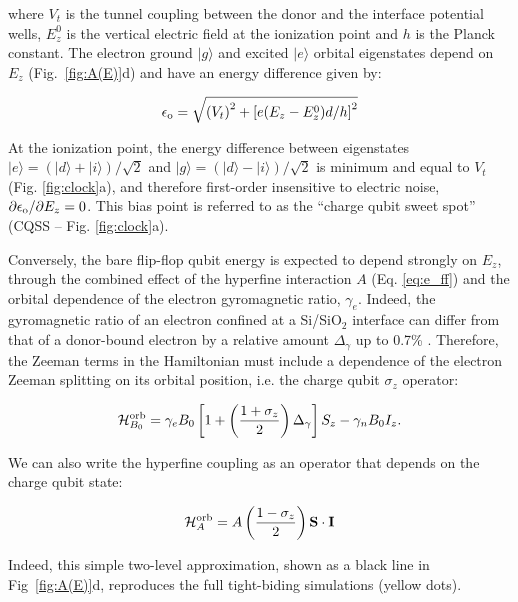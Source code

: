 \documentclass[aps,prb,superscriptaddress,nobibnotes,preprint]{revtex4-1}%
\begin{document}
where $V_t$ is the tunnel coupling between the donor and the interface potential wells, $E_z^0$ is the vertical electric field at the ionization point and $h$ is the Planck constant. The electron ground $|g\rangle$ and excited $|e\rangle$ orbital eigenstates depend on $E_z$ (Fig.~\ref{fig:A(E)}d) and have an energy difference given by:

\begin{equation} \label{eq:e_o}
\epsilon_{\rm o}=\sqrt{\left(V_t\right)^2+\left[e(E_z - E_z^0) d/h\right]^2}
\end{equation}

At the ionization point, the energy difference between eigenstates $|e\rangle=(|d\rangle+|i\rangle)/\sqrt{2}$ and $|g\rangle=(|d\rangle-|i\rangle)/\sqrt{2}$ is minimum and equal to $V_t$ (Fig. \ref{fig:clock}a), and therefore first-order insensitive to electric noise, $\partial\epsilon_{\rm o}/\partial E_z=0$. This bias point is referred to as the ``charge qubit sweet spot''\cite{Kim2015a} (CQSS -- Fig. \ref{fig:clock}a).

Conversely, the bare flip-flop qubit energy is expected to depend strongly on $E_z$, through the combined effect of the hyperfine interaction $A$ (Eq. \ref{eq:e_ff}) and the orbital dependence of the electron gyromagnetic ratio, $\gamma_e$. Indeed, the gyromagnetic ratio of an electron confined at a Si/SiO$_2$ interface can differ from that of a donor-bound electron by a relative amount $\Delta_{\gamma}$ up to 0.7\% \cite{Rahman2009a}. Therefore, the Zeeman terms in the Hamiltonian must include a dependence of the electron Zeeman splitting on its orbital position, i.e. the charge qubit $\sigma_z$ operator:

\begin{equation} \label{eq:H_Zeeman_orb}
\mathcal{H}_{B_0}^{\rm orb}=\gamma_e B_0\left[1+\left(\frac{1+\sigma_z}{2}\right)\Delta_\gamma\right]S_z - \gamma_n B_0 I_z.
\end{equation}

We can also write the hyperfine coupling as an operator that depends on the charge qubit state:

\begin{equation} \label{eq:H_A}
\mathcal{H}_{A}^{\rm orb}=A\left(\frac{1 - \sigma_z}{2}\right){\bf S\cdot I}
\end{equation}

Indeed, this simple two-level approximation, shown as a black line in Fig~\ref{fig:A(E)}d, reproduces the full tight-biding simulations (yellow dots).
\end{document}
